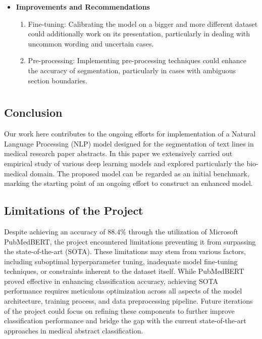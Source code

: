 \documentclass[12pt,a4paper]{report}     %
\begin{document}
\begin{normalsize}
{{{\begin{itemize}
\begin{enumerate}
         \item Boundary Cases: In boundary cases where abstracts had unconventional structures or complex terminology, the model showed resilience and maintained segmentation accuracy.
     \end{enumerate}
     \item \textbf{Improvements and Recommendations}
     \begin{enumerate}
         \item Fine-tuning: Calibrating the model on a bigger and more different dataset could additionally work on its presentation, particularly in dealing with uncommon wording and uncertain cases.
         \item Pre-processing: Implementing pre-processing techniques could enhance the accuracy of segmentation, particularly in cases with ambiguous section boundaries.


     \end{enumerate}
 \end{itemize}

\newpage 
\chapter{}
{\setlength{\baselineskip}{1.1\baselineskip}
\section{Conclusion}
Our work here contributes to the ongoing efforts for implementation of a Natural Language Processing (NLP) model designed for the segmentation of text lines in medical research paper abstracts. In this paper we extensively carried out empirical study of various deep learning models and explored particularly the bio-medical domain. The proposed model can be regarded as an initial benchmark, marking the starting point of an ongoing effort to construct an enhanced model.
\section{Limitations of the Project}

Despite achieving an accuracy of 88.4\% through the utilization of Microsoft PubMedBERT, the project encountered limitations preventing it from surpassing the state-of-the-art (SOTA). These limitations may stem from various factors, including suboptimal hyperparameter tuning, inadequate model fine-tuning techniques, or constraints inherent to the dataset itself. While PubMedBERT proved effective in enhancing classification accuracy, achieving SOTA performance requires meticulous optimization across all aspects of the model architecture, training process, and data preprocessing pipeline. Future iterations of the project could focus on refining these components to further improve classification performance and bridge the gap with the current state-of-the-art approaches in medical abstract classification.
\newpage

}}}}
\end{normalsize}
\end{document}

